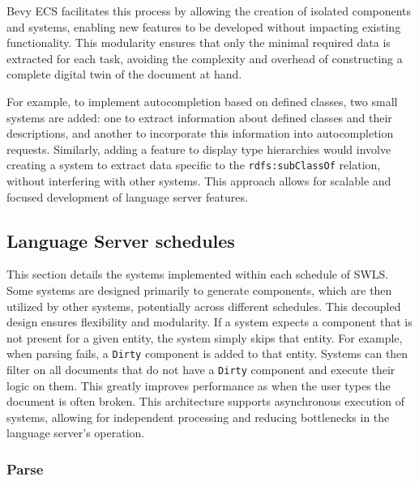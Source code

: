 Bevy ECS facilitates this process by allowing the creation of isolated components and systems, enabling new features to be developed without impacting existing functionality.
This modularity ensures that only the minimal required data is extracted for each task, avoiding the complexity and overhead of constructing a complete digital twin of the document at hand.

For example, to implement autocompletion based on defined classes, two small systems are added:
  one to extract information about defined classes and their descriptions,
  and another to incorporate this information into autocompletion requests. 
Similarly, adding a feature to display type hierarchies would involve creating a system to extract data specific to the \texttt{rdfs:subClassOf} relation, without interfering with other systems.
This approach allows for scalable and focused development of language server features.


\subsection{Language Server schedules}

This section details the systems implemented within each schedule of SWLS.
Some systems are designed primarily to generate components, which are then utilized by other systems, potentially across different schedules.
This decoupled design ensures flexibility and modularity. 
If a system expects a component that is not present for a given entity, the system simply skips that entity.
For example, when parsing fails, a \texttt{Dirty} component is added to that entity.
Systems can then filter on all documents that do not have a \texttt{Dirty} component and execute their logic on them.
This greatly improves performance as when the user types the document is often broken.
This architecture supports asynchronous execution of systems, allowing for independent processing and reducing bottlenecks in the language server’s operation.

\subsubsection{Parse}

